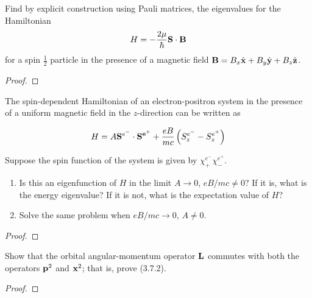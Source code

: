 \begin{exer}[3.2]

    Find by explicit construction using Pauli matrices, the eigenvalues
    for the Hamiltonian
    \[
        H = -\frac{2\mu}{\hbar} \mathbf{S} \cdot \mathbf{B} 
    \]
    for a spin $\frac{1}{2}$ particle in the presence of a magnetic
    field $\mathbf{B} = B_x \hat{\mathbf{x}} + B_y \hat{\mathbf{y}} + B_z \hat{\mathbf{z}}$.

\end{exer}

\begin{proof}

\end{proof}


\begin{exer}[3.4]

    The spin-dependent Hamiltonian of an electron-positron system in the
    presence of a uniform magnetic field in the $z$-direction can be
    written as

    \[
        H = A \mathbf{S}^{e^-} \cdot \mathbf{S^{e^+}} + \frac{e B}{mc}
        \left(S^{e^-}_{z} - S^{e^+}_{z} \right)
    \]

    Suppose the spin function of the system is given by $\chi^{e^-}_+
    \chi^{e^+}_-$.
    \begin{enumerate}
        \item Is this an eigenfunction of $H$ in the limit $A \to
            0$, $eB/mc \not= 0$? If it is, what is the energy eigenvalue?
            If it is not, what is the expectation value of $H$?
        \item Solve the same problem when $eB/mc \to 0$, $A \not= 0$.
    \end{enumerate}

\end{exer}

\begin{proof}

\end{proof}


\begin{exer}[3.16]

    Show that the orbital angular-momentum operator $\mathbf{L}$ commutes
    with both the operators $\mathbf{p}^2$ and $\mathbf{x}^2$; that is, prove
    (3.7.2).

\end{exer}

\begin{proof}

\end{proof}


